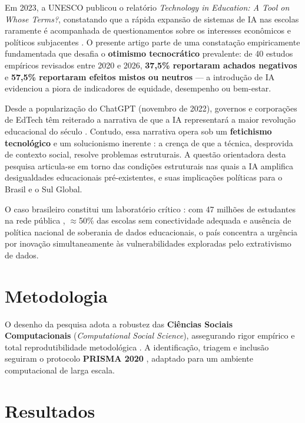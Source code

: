 \documentclass[preprint,12pt,authoryear]{elsarticle}
\begin{document}
Em 2023, a UNESCO publicou o relatório \textit{Technology in
Education: A Tool on Whose Terms?}, constatando que a rápida
expansão de sistemas de IA nas escolas raramente é acompanhada
de questionamentos sobre os interesses econômicos e políticos subjacentes
\citep{UNESCO2023}.
O presente artigo parte de uma constatação empiricamente fundamentada que desafia o 
\textbf{otimismo tecnocrático} prevalente:
de 40 estudos empíricos revisados entre 2020 e 2026,
\textbf{37,5\% reportaram achados negativos} e \textbf{57,5\% reportaram efeitos mistos ou neutros} --- a introdução de
IA evidenciou a piora de indicadores de equidade, desempenho ou bem-estar.

Desde a popularização do ChatGPT (novembro de 2022), governos
e corporações de EdTech têm reiterado a narrativa de que a IA
representará a maior revolução educacional do século
\citep{Holmes2022}.
Contudo, essa narrativa opera sob um \textbf{fetichismo tecnológico} e um 
solucionismo inerente \citep{Morozov2013}: a crença
de que a técnica, desprovida de contexto social, resolve problemas estruturais.
A questão orientadora desta pesquisa articula-se em torno das condições
estruturais nas quais a IA amplifica desigualdades educacionais pré-existentes,
e suas implicações políticas para o Brasil e o Sul Global.

O caso brasileiro constitui um laboratório crítico \citep{Yin2018}: com
47 milhões de estudantes na rede pública \citep{INEP2023},
$\approx$50\% das escolas sem conectividade adequada
\citep{CGIbr2023} e ausência de política nacional de soberania de
dados educacionais, o país concentra a urgência por inovação simultaneamente 
às vulnerabilidades exploradas pelo extrativismo de dados.

\section{Metodologia}

O desenho da pesquisa adota a robustez das \textbf{Ciências Sociais Computacionais}
(\textit{Computational Social Science}), assegurando rigor empírico e total
reprodutibilidade metodológica \citep{Lazer2020}.
A identificação, triagem e inclusão seguiram o protocolo \textbf{PRISMA 2020} \citep{Page2021},
adaptado para um ambiente computacional de larga escala.

\section{Resultados}
\end{document}
